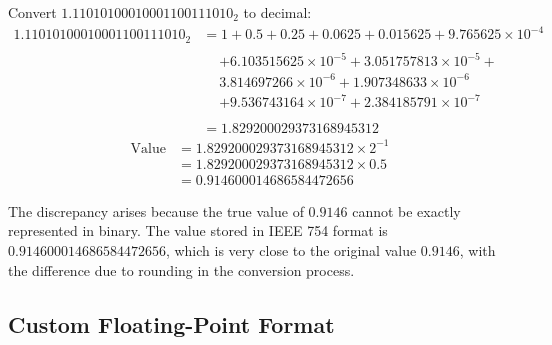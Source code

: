 Convert \(1.11010100010001100111010_2\) to decimal:
\begin{align*}
    1.11010100010001100111010_2 &= 1 + 0.5 + 0.25 + 0.0625 + 0.015625 + 9.765625 \times 10^{-4}\\
        &\begin{aligned}
        &+ 6.103515625 \times 10^{-5} + 3.051757813 \times 10^{-5} + \\
        & 3.814697266 \times 10^{-6} + 1.907348633 \times 10^{-6}\\
        &+ 9.536743164 \times 10^{-7} + 2.384185791 \times 10^{-7}\\
    \end{aligned}\\
        &= 1.829200029373168945312
\end{align*}
\begin{equation}
    \begin{aligned}
        \text{Value} &= 1.829200029373168945312 \times 2^{-1}\\
        &= 1.829200029373168945312 \times 0.5\\
        &= 0.914600014686584472656
    \end{aligned}
\end{equation}

The discrepancy arises because the true value of \(0.9146\) cannot be exactly represented in binary. The value stored in IEEE 754 format is \(0.914600014686584472656\), which is very close to the original value \(0.9146\), with the difference due to rounding in the conversion process.

\pagebreak


\setcounter{subsection}{4}
\subsection{Custom Floating-Point Format}
\label{app:custom-floating-point-formats}


